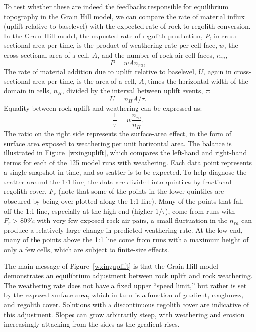 \documentclass[esurf, manuscript]{copernicus}
\begin{document}
To test whether these are indeed the feedbacks responsible for equilibrium topography in the Grain Hill model, we can compare the rate of material influx (uplift relative to baselevel) with the expected rate of rock-to-regolith conversion. In the Grain Hill model, the expected rate of regolith production, $P$, in cross-sectional area per time, is the product of weathering rate per cell face, $w$, the cross-sectional area of a cell, $A$, and the number of rock-air cell faces, $n_{ra}$,
\begin{equation}
P = w A n_{ra},
\end{equation}
The rate of material addition due to uplift relative to baselevel, $U$, again in cross-sectional area per time, is the area of a cell, $A$, times the horizontal width of the domain in cells, $n_H$, divided by the interval between uplift events, $\tau$:
\begin{equation}
U = n_H A / \tau.
\end{equation}
Equality between rock uplift and weathering can be expressed as:
\begin{equation}
\frac{1}{\tau} = w\frac{n_{ra}}{n_H}.
\end{equation}
The ratio on the right side represents the surface-area effect, in the form of surface area exposed to weathering per unit horizontal area. The balance is illustrated in Figure~\ref{wxinguplift}, which compares the left-hand and right-hand terms for each of the 125 model runs with weathering. Each data point represents a single snapshot in time, and so scatter is to be expected. To help diagnose the scatter around the 1:1 line, the data are divided into quintiles by fractional regolith cover, $F_r$ (note that some of the points in the lower quintiles are obscured by being over-plotted along the 1:1 line). Many of the points that fall off the 1:1 line, especially at the high end (higher $1/\tau$), come from runs with $F_r>80\%$; with very few exposed rock-air pairs, a small fluctuation in the $n_{ra}$ can produce a relatively large change in predicted weathering rate. At the low end, many of the points above the 1:1 line come from runs with a maximum height of only a few cells, which are subject to finite-size effects.

The main message of Figure~\ref{wxinguplift} is that the Grain Hill model demonstrates an equilibrium adjustment between rock uplift and rock weathering. The weathering rate does not have a fixed upper ``speed limit,'' but rather is set by the exposed surface area, which in turn is a function of gradient, roughness, and regolith cover. Solutions with a discontinuous regolith cover are indicative of this adjustment. Slopes can grow arbitrarily steep, with weathering and erosion increasingly attacking from the sides as the gradient rises. 
\end{document}
